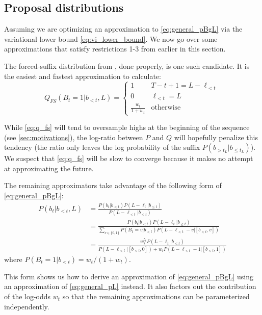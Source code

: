 \documentclass{article}
\begin{document}
\subsection{Proposal distributions}

Assuming we are optimizing an approximation to \cref{eq:general_pBgL} via
the variational lower bound \cref{eq:vi_lower_bound}. We now go over some
approximations that satisfy restrictions 1-3 from earlier in this section.

The forced-suffix distribution from
\cite{luoLearningOnlineAlignments2017,lawsonLearningHardAlignments2018}, done
properly, is one such candidate. It is the easiest and fastest approximation to
calculate:
%
\begin{equation} \label{eq:q_fs}
    Q_{FS}(B_t=1|b_{<t}, L) = \begin{cases}
        1 & T - t + 1 = L - \ell_{<t} \\
        0 & \ell_{<t} = L \\
        \frac{w_t}{1 + w_t} & \mathrm{otherwise}
    \end{cases}
\end{equation}

While \cref{eq:q_fs} will tend to oversample highs at the beginning of the
sequence (see \cref{sec:motivations}), the log-ratio between $P$ and $Q$ will
hopefully penalize this tendency (the ratio only leaves the log probability of
the suffix $P(b_{> t_L}|b_{\leq t_L})$). We suspect that \cref{eq:q_fs} will
be slow to converge because it makes no attempt at approximating the future.

The remaining approximators take advantage of the following form of
\cref{eq:general_pBgL}:
%
\begin{equation} \label{eq:general_pBgL_alt}
\begin{split}
    P(b_t|b_{<t}, L)
    &=  \frac{P(b_t|b_{<t})P(L - \ell_t|b_{\leq t})}
        {P(L - \ell_{<t}|b_{<t})} \\
    &= \frac{P(b_t|b_{<t})P(L - \ell_t|b_{\leq t})}
       {\sum_{v \in \{0,1\}} P(B_t=v|b_{<t})P(L - \ell_{<t} - v|[b_{<t}, v])} \\
    &= \frac{w_t^{b_t}P(L - \ell_t|b_{\leq t})}
        {P(L - \ell_{<t}|[b_{<t}, 0]) + w_t P(L - \ell_{<t} - 1|[b_{<t}, 1])}
\end{split}
\end{equation}
%
where $P(B_t=1|b_{<t}) = w_t / (1 + w_t)$.

This form shows us how to derive an approximation of \cref{eq:general_pBgL}
using an approximation of \cref{eq:general_pL} instead. It also factors out
the contribution of the log-odds $w_t$ so that the remaining approximations
can be parameterized independently.
\end{document}
